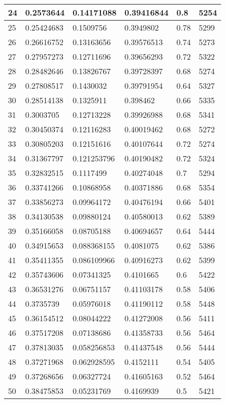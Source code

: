 \begin{longtable}{|l|l|l|l|l|l|}
24 & 0.2573644 & 0.14171088 & 0.39416844 & 0.8 & 5254 \\ \hline 
25 & 0.25424683 & 0.1509756 & 0.3949802 & 0.78 & 5299 \\ \hline 
26 & 0.26616752 & 0.13163656 & 0.39576513 & 0.74 & 5273 \\ \hline 
27 & 0.27957273 & 0.12711696 & 0.39656293 & 0.72 & 5322 \\ \hline 
28 & 0.28482646 & 0.13826767 & 0.39728397 & 0.68 & 5274 \\ \hline 
29 & 0.27808517 & 0.1430032 & 0.39791954 & 0.64 & 5327 \\ \hline 
30 & 0.28514138 & 0.1325911 & 0.398462 & 0.66 & 5335 \\ \hline 
31 & 0.3003705 & 0.12713228 & 0.39926988 & 0.68 & 5341 \\ \hline 
32 & 0.30450374 & 0.12116283 & 0.40019462 & 0.68 & 5272 \\ \hline 
33 & 0.30805203 & 0.12151616 & 0.40107644 & 0.72 & 5274 \\ \hline 
34 & 0.31367797 & 0.121253796 & 0.40190482 & 0.72 & 5324 \\ \hline 
35 & 0.32832515 & 0.1117499 & 0.40274048 & 0.7 & 5294 \\ \hline 
36 & 0.33741266 & 0.10868958 & 0.40371886 & 0.68 & 5354 \\ \hline 
37 & 0.33856273 & 0.09964172 & 0.40476194 & 0.66 & 5401 \\ \hline 
38 & 0.34130538 & 0.09880124 & 0.40580013 & 0.62 & 5389 \\ \hline 
39 & 0.35166058 & 0.08705188 & 0.40694657 & 0.64 & 5444 \\ \hline 
40 & 0.34915653 & 0.088368155 & 0.4081075 & 0.62 & 5386 \\ \hline 
41 & 0.35411355 & 0.086109966 & 0.40916273 & 0.62 & 5399 \\ \hline 
42 & 0.35743606 & 0.07341325 & 0.4101665 & 0.6 & 5422 \\ \hline 
43 & 0.36531276 & 0.06751157 & 0.41103178 & 0.58 & 5406 \\ \hline 
44 & 0.3735739 & 0.05976018 & 0.41190112 & 0.58 & 5448 \\ \hline 
45 & 0.36154512 & 0.08044222 & 0.41272008 & 0.56 & 5411 \\ \hline 
46 & 0.37517208 & 0.07138686 & 0.41358733 & 0.56 & 5464 \\ \hline 
47 & 0.37813035 & 0.058256853 & 0.41437548 & 0.56 & 5444 \\ \hline 
48 & 0.37271968 & 0.062928595 & 0.4152111 & 0.54 & 5405 \\ \hline 
49 & 0.37268656 & 0.06327724 & 0.41605163 & 0.52 & 5464 \\ \hline 
50 & 0.38475853 & 0.05231769 & 0.4169939 & 0.5 & 5421 \\ \hline 
\end{longtable}